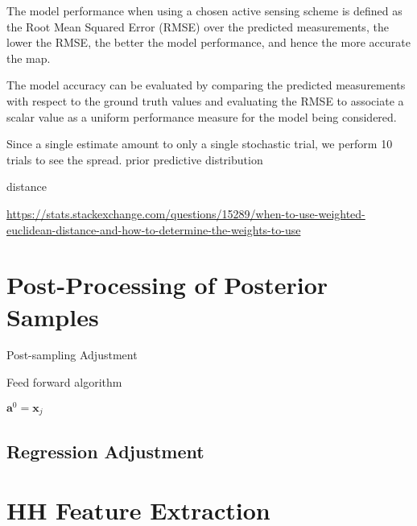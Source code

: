 The model performance when using a chosen active sensing scheme is defined as the Root Mean Squared Error (RMSE) over the predicted measurements, the lower the RMSE, the better the model performance, and hence the more accurate the map.

The model accuracy can be evaluated by comparing the predicted measurements with respect to the ground truth values and evaluating the RMSE to associate a scalar value as a uniform performance measure for the model being considered.


Since a single estimate amount to only a single stochastic trial, we perform 10 trials to see the spread. prior predictive distribution 


distance 

\url{https://stats.stackexchange.com/questions/15289/when-to-use-weighted-euclidean-distance-and-how-to-determine-the-weights-to-use}

\section{Post-Processing of Posterior Samples}\label{sec:post_processing}

Post-sampling Adjustment

\begin{algorithm}[H]
\caption{Feed forward algorithm}
\label{alg:FeedForward}
\begin{algorithmic}[1] 

        \State $\mathbf{a}^0 = \mathbf{x}_j$\;
\EndFor

\end{algorithmic}
\end{algorithm}

\subsection{Regression Adjustment}\label{sec:reg_adjust}

\section{HH Feature Extraction}\label{sec:hh_feature_extract}

